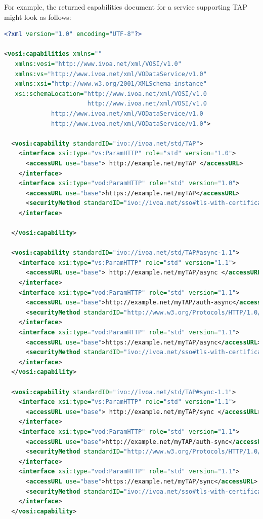 \documentclass[11pt,letter]{ivoa}
\begin{document}
For example, the returned capabilities document for a service supporting  TAP 
might look as follows:

\begin{lstlisting}[language=XML]
<?xml version="1.0" encoding="UTF-8"?>

<vosi:capabilities xmlns=""
   xmlns:vosi="http://www.ivoa.net/xml/VOSI/v1.0"
   xmlns:vs="http://www.ivoa.net/xml/VODataService/v1.0"
   xmlns:xsi="http://www.w3.org/2001/XMLSchema-instance"
   xsi:schemaLocation="http://www.ivoa.net/xml/VOSI/v1.0
                       http://www.ivoa.net/xml/VOSI/v1.0
             http://www.ivoa.net/xml/VODataService/v1.0
             http://www.ivoa.net/xml/VODataService/v1.0">

  <vosi:capability standardID="ivo://ivoa.net/std/TAP">
    <interface xsi:type="vs:ParamHTTP" role="std" version="1.0">
      <accessURL use="base"> http://example.net/myTAP </accessURL>
    </interface>
    <interface xsi:type="vod:ParamHTTP" role="std" version="1.0">
      <accessURL use="base">https://example.net/myTAP</accessURL>
      <securityMethod standardID="ivo://ivoa.net/sso#tls-with-certificate" />
    </interface>

  </vosi:capability>
  
  <vosi:capability standardID="ivo://ivoa.net/std/TAP#async-1.1">
    <interface xsi:type="vs:ParamHTTP" role="std" version="1.1">
      <accessURL use="base"> http://example.net/myTAP/async </accessURL>
    </interface>
    <interface xsi:type="vod:ParamHTTP" role="std" version="1.1">
      <accessURL use="base">http://example.net/myTAP/auth-async</accessURL>
      <securityMethod standardID="http://www.w3.org/Protocols/HTTP/1.0/spec.html#BasicAA" />
    </interface>
    <interface xsi:type="vod:ParamHTTP" role="std" version="1.1">
      <accessURL use="base">https://example.net/myTAP/async</accessURL>
      <securityMethod standardID="ivo://ivoa.net/sso#tls-with-certificate" />
    </interface>
  </vosi:capability>

  <vosi:capability standardID="ivo://ivoa.net/std/TAP#sync-1.1">
    <interface xsi:type="vs:ParamHTTP" role="std" version="1.1">
      <accessURL use="base"> http://example.net/myTAP/sync </accessURL>
    </interface>
    <interface xsi:type="vod:ParamHTTP" role="std" version="1.1">
      <accessURL use="base">http://example.net/myTAP/auth-sync</accessURL>
      <securityMethod standardID="http://www.w3.org/Protocols/HTTP/1.0/spec.html#BasicAA" />
    </interface>
    <interface xsi:type="vod:ParamHTTP" role="std" version="1.1">
      <accessURL use="base">https://example.net/myTAP/sync</accessURL>
      <securityMethod standardID="ivo://ivoa.net/sso#tls-with-certificate" />
    </interface>
  </vosi:capability>


\end{lstlisting}
\end{document}
